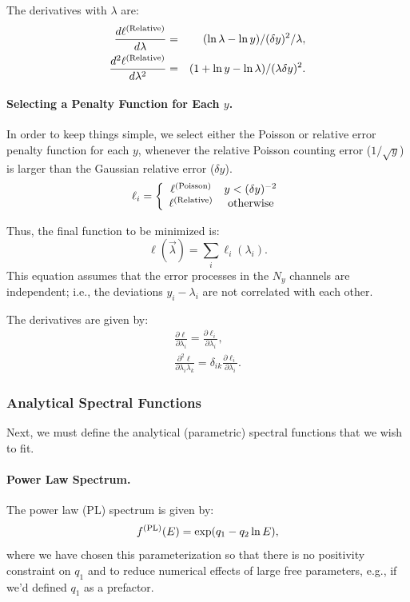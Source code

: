 \documentclass{article}    %
\newcommand{\subsubsubsection}[1]{\paragraph{#1.}}
\begin{document}
The derivatives with $\lambda$ are:
\begin{eqnarray}
\frac{d \ell^{\rm (Relative)}}{d \lambda} &=& (\ln\lambda-\ln y)/(\delta y)^2/\lambda, \\
\frac{d^2 \ell^{\rm (Relative)}}{d \lambda^2} &=& (1+\ln y - \ln \lambda)/(\lambda\delta y)^2.
\end{eqnarray}

\subsubsubsection{Selecting a Penalty Function for Each $y$}

In order to keep things simple, we select either the Poisson or
relative error penalty function for each $y$, whenever the relative
Poisson counting error ($1/\sqrt{y}$) is larger than the Gaussian
relative error ($\delta y$).
\begin{equation}
\ell_i = \left\{
\begin{array}{cl}
\ell^{\rm (Poisson)} & y < (\delta y)^{-2} \\
\ell^{\rm (Relative)} & {\rm ~ otherwise}
\end{array}
\right.
\end{equation}

Thus, the final function to be minimized is:
\begin{equation}
\ell(\vec{\lambda}) = \sum_i \ell_i(\lambda_i).
\end{equation}
This equation assumes that the error processes in the $N_y$ channels
are independent; i.e., the deviations $y_i-\lambda_i$ are not
correlated with each other.

The derivatives are given by:
\begin{eqnarray}
\frac{\partial \ell}{\partial \lambda_i} = \frac{\partial \ell_i}{\partial \lambda_i}, \\
\frac{\partial^2 \ell}{\partial \lambda_i \lambda_k} = \delta_{ik}\frac{\partial \ell_i}{\partial \lambda_i}.
\end{eqnarray}

\subsubsection{Analytical Spectral Functions}
\label{secAnalyticalSpectra}

Next, we must define the analytical (parametric) spectral functions
that we wish to fit.

\subsubsubsection{Power Law Spectrum}

The power law (PL) spectrum is given by:
\begin{equation}
f^{\rm (PL)}(E) = \exp(q_1 - q_2\ln E),
\end{equation}
where we have chosen this parameterization so that there is no
positivity constraint on $q_1$ and to reduce numerical effects of
large free parameters, e.g., if we'd defined $q_1$ as a prefactor.
\end{document}
